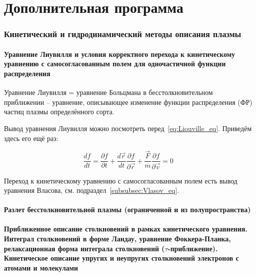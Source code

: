 \documentclass[10pt, a4paper]{article}
\let\stdsection\section
\renewcommand\section{\newpage\stdsection}
\let\stdpart\part
\renewcommand{\part}{\newpage\stdpart}
\begin{document}
\part{Дополнительная программа}


\section{Кинетический и гидродинамический методы описания плазмы}

\subsection{Уравнение Лиувилля и условия корректного перехода к кинетическому уравнению с самосогласованным полем для одночастичной функции распределения}

Уравнение Лиувилля = уравнение Больцмана в бесстолкновительном приближении -- уравнение, описывающее изменение функции распределения (ФР) частиц плазмы определённого сорта.

Вывод уравнения Лиувилля можно посмотреть перед~\ref{eq:Liouville_eq}. Приведём здесь его ещё раз:

\begin{equation}
	\frac{df}{dt} = \frac{\partial f}{\partial t} + \frac{d\vec{r}}{dt}\frac{\partial f}{\partial \vec{r}}+ \frac{\vec{F}}{m}\frac{\partial f}{\partial \vec{v}} = 0
\end{equation}

Переход к кинетическому уравнению с самосогласованным полем есть вывод уравнения Власова, см. подраздел~\ref{subsubsec:Vlasov_eq}.

\subsection{Разлет бесстолкновительной плазмы (ограниченной и из полупространства)}

\subsection[Приближенное описание столкновений в рамках кинетического уравнения. Интеграл столкновений в форме Ландау, уравнение Фоккера-Планка, релаксационная форма интеграла 	столкновений ($\tau$-приближение). Кинетическое описание упругих и неупругих столкновений электронов с атомами и молекулами. Приближенное описание кинетики электронов в слабом однородном электрическом поле (расчет эффективной частоты столкновений и нагрева электронов). Явление убегающих электронов]{Приближенное описание столкновений в рамках кинетического уравнения. Интеграл столкновений в форме Ландау, уравнение Фоккера-Планка, релаксационная форма интеграла 	столкновений \linebreak ($\tau$-приближение). Кинетическое описание упругих и неупругих столкновений электронов с атомами и молекулами} \label{subsec:collision_terms}
\end{document}
